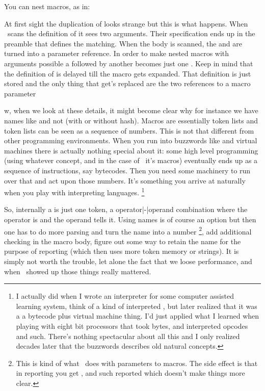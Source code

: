 \startsection[title=nesting]

You can nest macros, as in:

\startbuffer
\def\foo#1#2{\def\oof##1{<#1>##1<#2>}}
\stopbuffer

\typebuffer[option=TEX] \getbuffer

At first sight the duplication of \type {#} looks strange but this is what
happens. When \TEX\ scans the definition of \type {\foo} it sees two arguments.
Their specification ends up in the preamble that defines the matching. When the
body is scanned, the  and  are turned into a parameter
reference. In order to make nested macros with arguments possible a \type {#}
followed by another \type {#} becomes just one \type {#}. Keep in mind that the
definition of \type {\oof} is delayed till the macro \type {\foo} gets expanded.
That definition is just stored and the only thing that get's replaced are the two
references to a macro parameter

\luatokentable\foo

Now, when we look at these details, it might become clear why for instance we
have  names like  and not  (with or
without hash). Macros are essentially token lists and token lists can be seen as
a sequence of numbers. This is not that different from other programming
environments. When you run into buzzwords like  and \quote
{virtual machines} there is actually nothing special about it: some high level
programming (using whatever concept, and in the case of \TEX\ it's macros)
eventually ends up as a sequence of instructions, say bytecodes. Then you need
some machinery to run over that and act upon those numbers. It's something you
arrive at naturally when you play with interpreting languages. \footnote {I
actually did when I wrote an interpreter for some computer assisted learning
system, think of a kind of interpreted \PASCAL, but later realized that it was a a
bytecode plus virtual machine thing. I'd just applied what I learned when playing
with eight bit processors that took bytes, and interpreted opcodes and such.
There's nothing spectacular about all this and I only realized decades later that
the buzzwords describes old natural concepts.}

So, internally a  is just one token, a operator|-|operand combination
where the operator is  and the operand tells
 it. Using names is of course an option but then one
has to do more parsing and turn the name into a number \footnote {This is kind of
what \METAPOST\ does with parameters to macros. The side effect is that in
reporting you get ,  and such reported which doesn't
make things more clear.}, add additional checking in the macro body, figure out
some way to retain the name for the purpose of reporting (which then uses more
token memory or strings). It is simply not worth the trouble, let alone the fact
that we loose performance, and when \TEX\ showed up those things really mattered.

